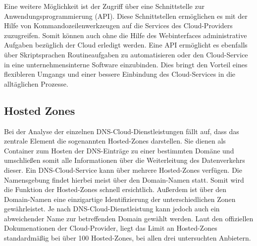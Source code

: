 Eine weitere Möglichkeit ist der Zugriff über eine Schnittstelle zur Anwendungsprogrammierung (API). Diese Schnittstellen ermöglichen es mit der Hilfe von Kommandozeilenwerkzeugen auf die Services des Cloud-Providers zuzugreifen. Somit können auch ohne die Hilfe des Webinterfaces administrative Aufgaben bezüglich der Cloud erledigt werden. Eine API ermöglicht es ebenfalls über Skriptsprachen Routineaufgaben zu automatisieren oder den Cloud-Service in eine unternehmensinterne Software einzubinden. Dies bringt den Vorteil eines flexibleren Umgangs und einer bessere Einbindung des Cloud-Services in die alltäglichen Prozesse.

 \subsection{Hosted Zones}
Bei der Analyse der einzelnen DNS-Cloud-Dienstleistungen fällt auf, dass das zentrale Element die sogenannten Hosted-Zones darstellen. Sie dienen als Container zum Hosten der DNS-Einträge zu einer bestimmten Domäne und umschließen somit alle Informationen über die Weiterleitung des Datenverkehrs dieser.
Ein DNS-Cloud-Service kann über mehrere Hosted-Zones verfügen. Die Namensgebung findet hierbei meist über den Domain-Namen statt. Somit wird die Funktion der Hosted-Zones schnell ersichtlich. Außerdem ist über den Domain-Namen eine einzigartige Identifizierung der unterschiedlichen Zonen gewährleistet. Je nach DNS-Cloud-Dienstleistung kann jedoch auch ein abweichender Name zur betreffenden Domain gewählt werden. Laut den offiziellen Dokumenationen der Cloud-Provider, liegt das Limit an Hosted-Zones standardmäßig bei über 100 Hosted-Zones, bei allen drei untersuchten Anbietern.